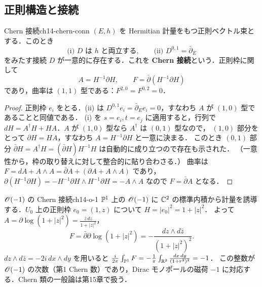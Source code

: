 \subsection{正則構造と接続}

\begin{mythm}{Chern 接続}{ch14-chern-conn}
$(E,h)$ を Hermitian 計量をもつ正則ベクトル束とする．このとき
\begin{equation}
  \text{(i) } D \text{ は } h \text{ と両立する},\qquad \text{(ii) } D^{0,1} = \bar\partial_E
\end{equation}
をみたす接続 $D$ が一意的に存在する．これを \textbf{Chern 接続}という．正則枠に関して
\begin{equation}
  A = H^{-1}\partial H,\qquad F = \bar\partial(H^{-1}\partial H)
  \label{eq:ch14-chern}
\end{equation}
であり，曲率は $(1,1)$ 型である：$F^{2,0}=F^{0,2}=0$．
\end{mythm}

\begin{proof}
正則枠 $e_i$ をとる．(ii) は $D^{0,1}e_i = \bar\partial_E e_i = 0$，すなわち $A$ が $(1,0)$ 型であることと同値である．
(i) を $s=e_i,t=e_j$ に適用すると，行列で $dH = A^\dagger H + HA$．$A$ が $(1,0)$ 型なら $A^\dagger$ は $(0,1)$ 型なので，
$(1,0)$ 部分をとって $\partial H = HA$，すなわち $A=H^{-1}\partial H$ と一意に決まる．
このとき $(0,1)$ 部分 $\bar\partial H = A^\dagger H = (\bar\partial H)H^{-1}H$ は自動的に成り立つので存在も示された．
（一意性から，枠の取り替えに対して整合的に貼り合わさる．）
曲率は $F = dA + A\wedge A = \bar\partial A + (\partial A + A\wedge A)$ であり，
$\partial(H^{-1}\partial H) = -H^{-1}\partial H\wedge H^{-1}\partial H = -A\wedge A$ なので $F=\bar\partial A$ となる．
\end{proof}

\begin{myex}{$\mathscr{O}(-1)$ の Chern 接続}{ch14-o-1}
$\mathbb{P}^1$ 上の $\mathscr{O}(-1)$ に $\mathbb{C}^2$ の標準内積から計量を誘導する．$U_0$ 上の正則枠 $e_0=(1,z)$ について $H=|e_0|^2=1+|z|^2$．
よって $A = \partial\log(1+|z|^2)=\frac{\bar z\,dz}{1+|z|^2}$，
\begin{equation}
  F = \bar\partial\partial\log(1+|z|^2) = -\frac{dz\wedge d\bar z}{(1+|z|^2)^2}.
\end{equation}
$dz\wedge d\bar z=-2i\,dx\wedge dy$ を用いると $\frac{i}{2\pi}\int_{\mathbb{P}^1}F = -\frac{1}{\pi}\int_{\mathbb{R}^2}\frac{dx\,dy}{(1+r^2)^2}=-1$．
この整数が $\mathscr{O}(-1)$ の次数（第1 Chern 数）であり，Dirac モノポールの磁荷 $-1$ に対応する．Chern 類の一般論は第15章で扱う．
\end{myex}

